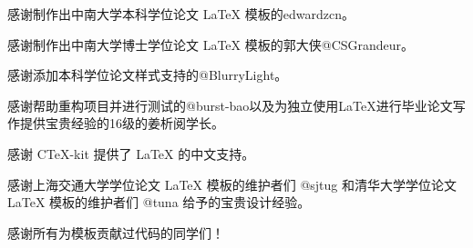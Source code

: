 \begin{acknowledgements} 

感谢制作出中南大学本科学位论文 LaTeX 模板的edwardzcn。

感谢制作出中南大学博士学位论文 LaTeX 模板的郭大侠@CSGrandeur。

感谢添加本科学位论文样式支持的@BlurryLight。

感谢帮助重构项目并进行测试的@burst-bao以及为独立使用LaTeX进行毕业论文写作提供宝贵经验的16级的姜析阅学长。

感谢 CTeX-kit 提供了 LaTeX 的中文支持。

感谢上海交通大学学位论文 LaTeX 模板的维护者们 @sjtug 和清华大学学位论文 LaTeX 模板的维护者们 @tuna 给予的宝贵设计经验。

感谢所有为模板贡献过代码的同学们！

\end{acknowledgements}
